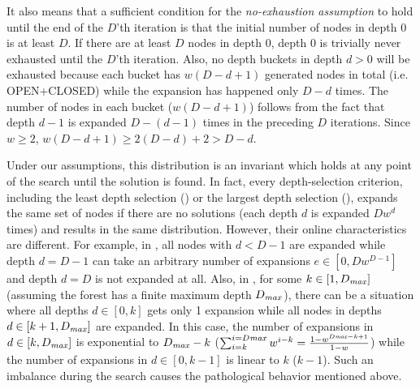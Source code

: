 It also means that a sufficient condition for the \emph{no-exhaustion assumption} to hold until the end of the $D$'th
iteration is that the initial number of nodes in depth 0 is at least $D$.  If there are at least $D$ nodes in depth
0, depth 0 is trivially never exhausted until the $D$'th iteration. Also, no depth buckets in depth $d>0$ will be exhausted 
because each bucket has $w(D-d+1)$ generated nodes in total (i.e. OPEN+CLOSED) while the expansion has
happened only $D-d$ times.
The number of nodes in each bucket ($w(D-d+1)$) follows from the fact that  depth $d-1$ is expanded $D-(d-1)$ times in the preceding $D$ iterations.
Since $w\geq 2$, $w(D-d+1)\geq 2(D-d)+2>D-d$.

Under our assumptions,  this distribution is an invariant which holds at any point of the search
until the solution is found. In fact, every depth-selection criterion, including the least depth selection (\fifo) or
the largest depth selection (\lifo), expands the same set of nodes if there are no solutions (each depth
$d$ is expanded $Dw^d$ times) and results in the same distribution.
However, their online characteristics are different.
For example, in \fifo, all nodes with $d<D-1$ are expanded while depth $d=D-1$ can take an arbitrary number of expansions $e \in [0, Dw^{D-1}]$ and depth $d=D$ is not expanded at all.
Also, in \lifo, for some $k\in [1,D_\mit{max}]$ (assuming the forest has a finite maximum depth $D_\mit{max}$), there can be a situation where all depths $d \in [0,k]$ gets only 1 expansion
while all nodes in depths $d \in [k+1,D_\mit{max}]$ are expanded. In this case, the number of expansions in $d \in [k,D_\mit{max}]$ is exponential to $D_\mit{max}-k$ ($\sum_{i=k}^{i=D\mit{max}}w^{i-k}=\frac{1-w^{D\mit{max}-k+1}}{1-w}$) while the number of expansions in $d \in [0,k-1]$ is linear to $k$ ($k-1$). Such an imbalance during the search causes the pathological behavior mentioned above.


